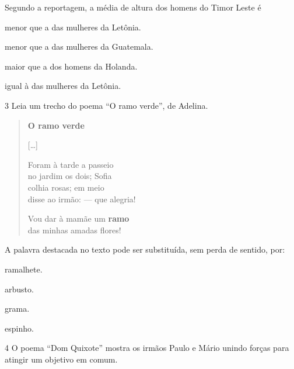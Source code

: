 Segundo a reportagem, a média de altura dos homens do Timor Leste é

\begin{escolha}
\item menor que a das mulheres da Letônia.

\item menor que a das mulheres da Guatemala.

\item maior que a dos homens da Holanda.

\item igual à das mulheres da Letônia.
\end{escolha}


\num{3} Leia um trecho do poema ``O ramo verde'', de Adelina.

\begin{myquote}
\begin{verse}
\textbf{O ramo verde}

{[}\ldots{}{]}

Foram à tarde a passeio\\
no jardim os dois; Sofia\\
colhia rosas; em meio\\
disse ao irmão: --- que alegria!

Vou dar à mamãe um \textbf{ramo}\\
das minhas amadas flores!
\end{verse}

\end{myquote}

A palavra destacada no texto pode ser substituída, sem perda de sentido,
por:

\begin{escolha}
\item ramalhete.

\item arbusto.

\item grama.

\item espinho.
\end{escolha}

\num{4} O poema ``Dom Quixote'' mostra os irmãos Paulo e Mário unindo
forças para atingir um objetivo em comum.

